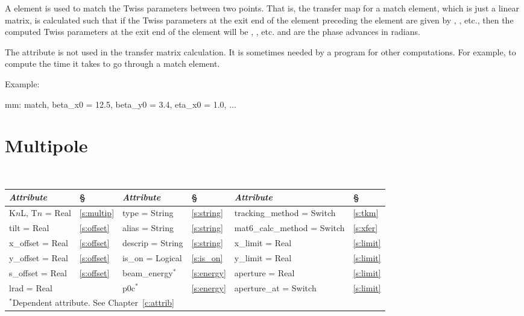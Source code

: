 {{
A  element is used to match the Twiss parameters between two
points. That is, the transfer map for a match element, which is just a
linear matrix, is calculated such that if the Twiss parameters at the
exit end of the element preceding the  element are given by
, , etc., then the computed Twiss parameters
at the exit end of the  element will be ,
, etc.  and  are the phase advances
in radians.

The attribute  is not used in the transfer matrix
calculation. It is sometimes needed by a program for other
computations. For example, to compute the time it takes to go through
a match element.

Example:
\begin{example}
  mm: match, beta_x0 = 12.5, beta_y0 = 3.4, eta_x0 = 1.0, ...
\end{example}

\section{Multipole}
\label{s:mult}

\begin{center}
\tt
\begin{tabular}{|l|l||l|l||l|l|} \hline
  {\sl Attribute} & \S  & {\sl Attribute} & \S & {\sl Attribute} & \S \\ \hline
  K$n$L, T$n$ = Real &  \ref{s:multip} &  type = String       & \ref{s:string} & tracking\_method = Switch   & \ref{s:tkm}   \\ \hline
  tilt       = Real  &  \ref{s:offset} &  alias = String      & \ref{s:string} & mat6\_calc\_method = Switch & \ref{s:xfer}  \\ \hline
  x\_offset  = Real  &  \ref{s:offset} &  descrip = String    & \ref{s:string} & x\_limit = Real             & \ref{s:limit} \\ \hline
  y\_offset  = Real  &  \ref{s:offset} &  is\_on = Logical    & \ref{s:is_on}  & y\_limit = Real             & \ref{s:limit} \\ \hline
  s\_offset  = Real  &  \ref{s:offset} &  beam\_energy$^*$    & \ref{s:energy} & aperture = Real             & \ref{s:limit} \\ \hline
  lrad       = Real  &                 &  p0c$^*$             & \ref{s:energy} & aperture\_at = Switch       & \ref{s:limit} \\ \hline
  \multicolumn{6}{l}{\small $^*$Dependent attribute. See Chapter~\ref{c:attrib}} \\
\end{tabular}
\end{center}
\toffset

}}
